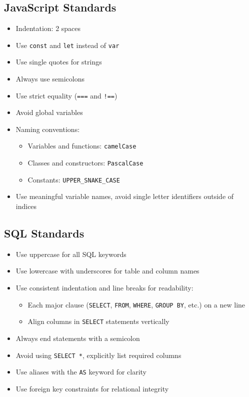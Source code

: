 \documentclass[10pt,titlepage]{article}
\begin{document}
	\subsection*{JavaScript Standards}
	\begin{itemize}
		\item Indentation: 2 spaces
		\item Use \texttt{const} and \texttt{let} instead of \texttt{var}
		\item Use single quotes for strings
		\item Always use semicolons
		\item Use strict equality (\texttt{===} and \texttt{!==})
		\item Avoid global variables
		\item Naming conventions:
		\begin{itemize}
			\item Variables and functions: \texttt{camelCase}
			\item Classes and constructors: \texttt{PascalCase}
			\item Constants: \texttt{UPPER\_SNAKE\_CASE}
		\end{itemize}
		\item Use meaningful variable names, avoid single letter identifiers outside of indices 
	\end{itemize}
	
	\subsection*{SQL Standards}
	\begin{itemize}
		\item Use uppercase for all SQL keywords 
		\item Use lowercase with underscores for table and column names
		\item Use consistent indentation and line breaks for readability:
		\begin{itemize}
			\item Each major clause (\texttt{SELECT}, \texttt{FROM}, \texttt{WHERE}, \texttt{GROUP BY}, etc.) on a new line
			\item Align columns in \texttt{SELECT} statements vertically
		\end{itemize}
		\item Always end statements with a semicolon
		\item Avoid using \texttt{SELECT *}, explicitly list required columns
		\item Use aliases with the \texttt{AS} keyword for clarity
		\item Use foreign key constraints for relational integrity
	\end{itemize}
	
\end{document}
